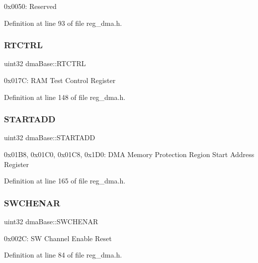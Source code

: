 0x0050\+: Reserved 

Definition at line 93 of file reg\+\_\+dma.\+h.

\mbox{\label{structdmaBase_a9d0d4c827dca09570aff846faf4817a9}} 
\subsubsection{\texorpdfstring{R\+T\+C\+T\+RL}{RTCTRL}}
{\footnotesize\ttfamily uint32 dma\+Base\+::\+R\+T\+C\+T\+RL}

0x017C\+: R\+AM Test Control Register 

Definition at line 148 of file reg\+\_\+dma.\+h.

\mbox{\label{structdmaBase_ad04d7281f2cc05846088622762ed23bd}} 
\subsubsection{\texorpdfstring{S\+T\+A\+R\+T\+A\+DD}{STARTADD}}
{\footnotesize\ttfamily uint32 dma\+Base\+::\+S\+T\+A\+R\+T\+A\+DD}

0x01\+B8, 0x01\+C0, 0x01\+C8, 0x1\+D0\+: D\+MA Memory Protection Region Start Address Register 

Definition at line 165 of file reg\+\_\+dma.\+h.

\mbox{\label{structdmaBase_adb2be1c8668fa06676ea38d8e9fda7db}} 
\subsubsection{\texorpdfstring{S\+W\+C\+H\+E\+N\+AR}{SWCHENAR}}
{\footnotesize\ttfamily uint32 dma\+Base\+::\+S\+W\+C\+H\+E\+N\+AR}

0x002C\+: SW Channel Enable Reset 

Definition at line 84 of file reg\+\_\+dma.\+h.

\mbox{\label{structdmaBase_aa930ff1a2548fb70d8745c624b6bc1c0}} 
